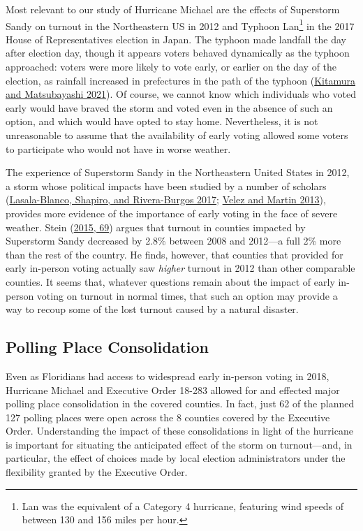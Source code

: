 \documentclass[
  12pt,
]{article}
\begin{document}
Most relevant to our study of Hurricane Michael are the effects of Superstorm Sandy on turnout in the Northeastern US in 2012 and Typhoon Lan\footnote{Lan was the equivalent of a Category 4 hurricane, featuring wind speeds of between 130 and 156 miles per hour.} in the 2017 House of Representatives election in Japan. The typhoon made landfall the day after election day, though it appears voters behaved dynamically as the typhoon approached: voters were more likely to vote early, or earlier on the day of the election, as rainfall increased in prefectures in the path of the typhoon (\protect\hyperlink{ref-Kitamura2021}{Kitamura and Matsubayashi 2021}). Of course, we cannot know which individuals who voted early would have braved the storm and voted even in the absence of such an option, and which would have opted to stay home. Nevertheless, it is not unreasonable to assume that the availability of early voting allowed some voters to participate who would not have in worse weather.

The experience of Superstorm Sandy in the Northeastern United States in 2012, a storm whose political impacts have been studied by a number of scholars (\protect\hyperlink{ref-Lasala-Blanco2017}{Lasala-Blanco, Shapiro, and Rivera-Burgos 2017}; \protect\hyperlink{ref-Velez2013}{Velez and Martin 2013}), provides more evidence of the importance of early voting in the face of severe weather. Stein (\protect\hyperlink{ref-Stein2015}{2015, 69}) argues that turnout in counties impacted by Superstorm Sandy decreased by 2.8\% between 2008 and 2012---a full 2\% more than the rest of the country. He finds, however, that counties that provided for early in-person voting actually saw \emph{higher} turnout in 2012 than other comparable counties. It seems that, whatever questions remain about the impact of early in-person voting on turnout in normal times, that such an option may provide a way to recoup some of the lost turnout caused by a natural disaster.

\hypertarget{polling-place-consolidation}{%
\subsection*{Polling Place Consolidation}\label{polling-place-consolidation}}

Even as Floridians had access to widespread early in-person voting in 2018, Hurricane Michael and Executive Order 18-283 allowed for and effected major polling place consolidation in the covered counties. In fact, just 62 of the planned 127 polling places were open across the 8 counties covered by the Executive Order. Understanding the impact of these consolidations in light of the hurricane is important for situating the anticipated effect of the storm on turnout---and, in particular, the effect of choices made by local election administrators under the flexibility granted by the Executive Order.
\end{document}
